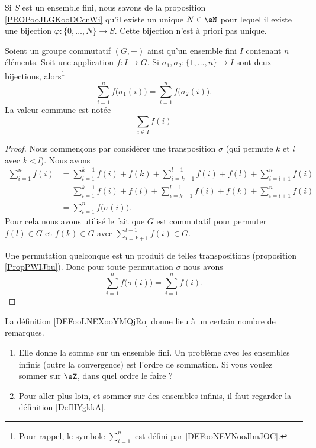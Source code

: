 Si \( S\) est un ensemble fini, nous savons de la proposition \ref{PROPooJLGKooDCcnWi} qu'il existe un unique \( N\in \eN\) pour lequel il existe une bijection \( \varphi\colon \{ 0,\ldots, N \}\to S\). Cette bijection n'est à priori pas unique.

\begin{lemmaDef}       \label{DEFooLNEXooYMQjRo}
	Soient un groupe commutatif \( (G,+)\) ainsi qu'un ensemble fini \( I\) contenant \( n\) éléments. Soit une application \( f\colon I\to G \). Si \( \sigma_1,\sigma_2\colon \{1,\ldots, n \}\to I\) sont deux bijections, alors\footnote{Pour rappel, le symbole \( \sum_{i=1}^n\) est défini par \ref{DEFooNEVNooJlmJOC}.}
	\begin{equation}
		\sum_{i=1}^nf\big( \sigma_1(i) \big)=\sum_{i=1}^nf\big( \sigma_2(i) \big).
	\end{equation}
	La valeur commune est notée
	\begin{equation}
		\sum_{i\in I}f(i)
	\end{equation}
\end{lemmaDef}

\begin{proof}
	Nous commençons par considérer une transposition \( \sigma\) (qui permute \( k\) et \( l\) avec \( k<l\)). Nous avons
	\begin{subequations}
		\begin{align}
			\sum_{i=1}^nf(i) & =\sum_{i=1}^{k-1}f(i)+f(k)+\sum_{i=k+1}^{l-1}f(i)+f(l)+\sum_{i=l+1}^nf(i) \\
			                 & =\sum_{i=1}^{k-1}f(i)+f(l)+\sum_{i=k+1}^{l-1}f(i)+f(k)+\sum_{i=l+1}^nf(i) \\
			                 & =\sum_{i=1}^nf\big( \sigma(i) \big).
		\end{align}
	\end{subequations}
	Pour cela nous avons utilisé le fait que \( G\) est commutatif pour permuter \( f(l)\in G\) et \( f(k)\in G\) avec \( \sum_{i=k+1}^{l-1}f(i)\in G\).

	Une permutation quelconque est un produit de telles transpositions (proposition \ref{PropPWIJbu}). Donc pour toute permutation \( \sigma\) nous avons
	\begin{equation}
		\sum_{i=1}^nf\big( \sigma(i) \big)=\sum_{i=1}^nf(i).
	\end{equation}
\end{proof}

La définition \ref{DEFooLNEXooYMQjRo} donne lieu à un certain nombre de remarques.
\begin{enumerate}
	\item
	      Elle donne la somme sur un ensemble fini. Un problème avec les ensembles infinis (outre la convergence) est l'ordre de sommation. Si vous voulez sommer sur \( \eZ\), dans quel ordre le faire ?
	\item
	      Pour aller plus loin, et sommer sur des ensembles infinis, il faut regarder la définition \ref{DefHYgkkA}.
\end{enumerate}

